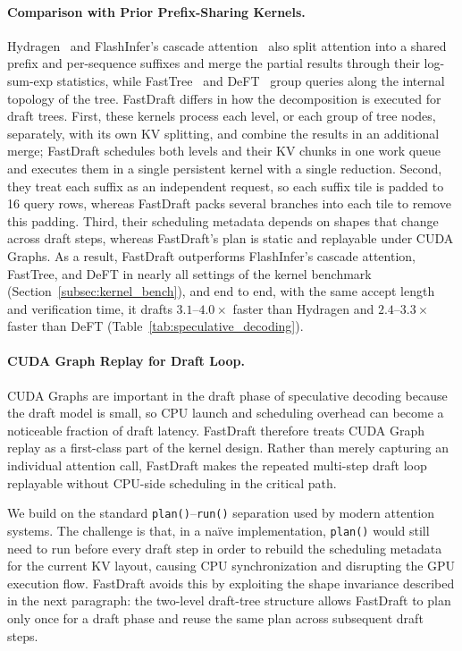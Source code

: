 \documentclass{article}
\begin{document}
\paragraph{Comparison with Prior Prefix-Sharing Kernels.}
Hydragen~\cite{hydragen} and FlashInfer's cascade attention~\cite{cascade-inference} also split attention into a shared prefix and per-sequence suffixes and merge the partial results through their log-sum-exp statistics, while FastTree~\cite{pan2025fasttree} and DeFT~\cite{yao2025deftdecodingflashtreeattention} group queries along the internal topology of the tree. FastDraft differs in how the decomposition is executed for draft trees. First, these kernels process each level, or each group of tree nodes, separately, with its own KV splitting, and combine the results in an additional merge; FastDraft schedules both levels and their KV chunks in one work queue and executes them in a single persistent kernel with a single reduction. Second, they treat each suffix as an independent request, so each suffix tile is padded to 16 query rows, whereas FastDraft packs several branches into each tile to remove this padding. Third, their scheduling metadata depends on shapes that change across draft steps, whereas FastDraft's plan is static and replayable under CUDA Graphs. As a result, FastDraft outperforms FlashInfer's cascade attention, FastTree, and DeFT in nearly all settings of the kernel benchmark (Section~\ref{subsec:kernel_bench}), and end to end, with the same accept length and verification time, it drafts $3.1$--$4.0\times$ faster than Hydragen and $2.4$--$3.3\times$ faster than DeFT (Table~\ref{tab:speculative_decoding}).

\paragraph{CUDA Graph Replay for Draft Loop.}
CUDA Graphs are important in the draft phase of speculative decoding because the draft model is small, so CPU launch and scheduling overhead can become a noticeable fraction of draft latency. FastDraft therefore treats CUDA Graph replay as a first-class part of the kernel design. Rather than merely capturing an individual attention call, FastDraft makes the repeated multi-step draft loop replayable without CPU-side scheduling in the critical path.

We build on the standard \texttt{plan()}--\texttt{run()} separation used by modern attention systems. The challenge is that, in a na\"ive implementation, \texttt{plan()} would still need to run before every draft step in order to rebuild the scheduling metadata for the current KV layout, causing CPU synchronization and disrupting the GPU execution flow. FastDraft avoids this by exploiting the shape invariance described in the next paragraph: the two-level draft-tree structure allows FastDraft to plan only once for a draft phase and reuse the same plan across subsequent draft steps.
\end{document}
